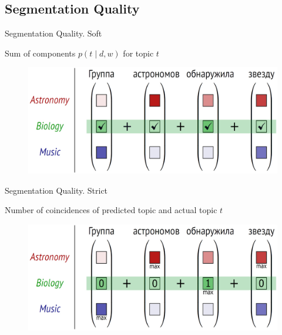 \documentclass[russian]{beamer}
\begin{document}
	
\subsection{Segmentation Quality}


\begin{frame}{Segmentation Quality. Soft}
  \begin{block}{}
    Sum of components $p(t \mid d, w)$ for topic $t$
  \end{block}
  
  \begin{figure}[h]
    \centering
    \includegraphics[width=1.0\textwidth, height=0.45\textheight]{astronomers_soft.eps} %
  \end{figure}
\end{frame}


\begin{frame}{Segmentation Quality. Strict}
  \begin{block}{}
    Number of coincidences of predicted topic and actual topic $t$
  \end{block}
  
  \begin{figure}[h]
    \centering
    \includegraphics[width=1.0\textwidth, height=0.45\textheight]{astronomers_strict.eps} %
  \end{figure}
\end{frame}
\end{document}
